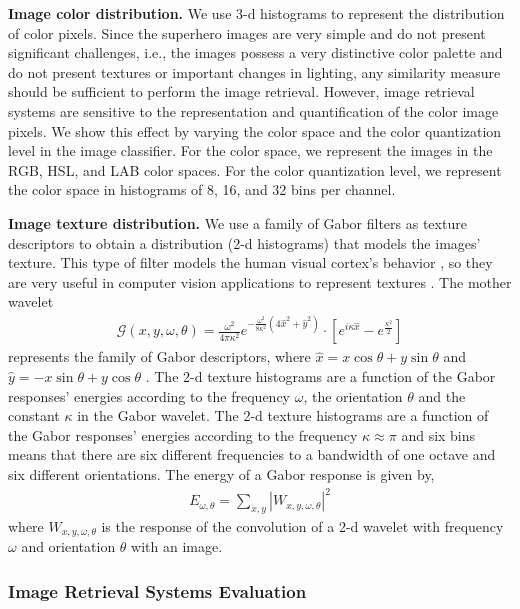 \textbf{Image color distribution.} We use 3-d histograms to represent the distribution of color pixels. Since the superhero images are very simple and do not present significant challenges, i.e., the images possess a very distinctive color palette and do not present textures or important changes in lighting, any similarity measure should be sufficient to perform the image retrieval. However, image retrieval systems are sensitive to the representation and quantification of the color image pixels. We show this effect by varying the color space and the color quantization level in the image classifier. For the color space, we represent the images in the RGB, HSL, and LAB color spaces. For the color quantization level, we represent the color space in histograms of 8, 16, and 32 bins per channel.

\textbf{Image texture distribution.} We use a family of Gabor filters as texture descriptors to obtain a distribution (2-d histograms) that models the images' texture. This type of filter models the human visual cortex's behavior \citep{Daugman:TASSP:1988}, so they are very useful in computer vision applications to represent textures \citep{Lee:PAMI:1996}. The mother wavelet
\begin{eqnarray}
 \mathcal{G}(x,y,\omega,\theta) = \frac{\omega^2}{4\pi\kappa^2} e^{-\frac{\omega^2}{8\kappa^2}\left(4\hat{x}^2 + \hat{y}^2\right)} \cdot [e ^{i \kappa \hat{x}} -e ^ {\frac{\kappa ^ 2}{2}} ]  \label{eq:gabor_filters}
\end{eqnarray}
represents the family of Gabor descriptors, where $\hat{x} = x \cos \theta +  y \sin \theta$ and $\hat{y} = -x\sin \theta + y \cos \theta$ . The 2-d texture histograms are a function of the Gabor responses' energies according to the frequency $\omega$, the orientation $\theta$ and the constant $\kappa$ in the Gabor wavelet. The 2-d texture histograms are a function of the Gabor responses' energies according to the frequency  $\kappa \approx \pi$ and six bins means that there are six different frequencies to a bandwidth of one octave and six different orientations. The energy of a Gabor response is given by, 
\begin{eqnarray} 
 E_{\omega,\theta} = \sum\nolimits_{x, y}|W_{x,y,\omega,\theta}|^2 \label{eq:g_energy}
\end{eqnarray}
where $W_{x,y,\omega,\theta}$ is the response of the convolution of a 2-d wavelet with frequency $\omega$ and orientation $\theta$ with an image. 

\subsubsection{Image Retrieval Systems Evaluation} \label{subsubsec:evaluation}

